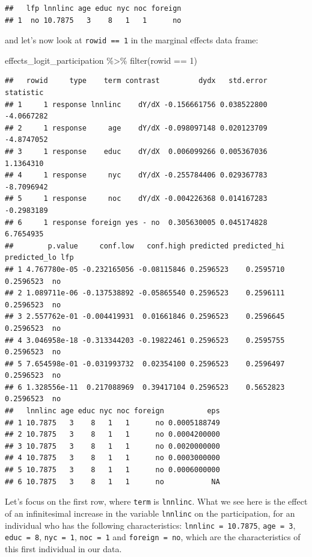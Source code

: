 \documentclass[
]{article}
\newenvironment{Shaded}{\begin{snugshade}}{\end{snugshade}}
\newcommand{\DecValTok}[1]{\textcolor[rgb]{0.00,0.00,0.81}{#1}}
\newcommand{\FunctionTok}[1]{\textcolor[rgb]{0.00,0.00,0.00}{#1}}
\newcommand{\NormalTok}[1]{#1}
\newcommand{\SpecialCharTok}[1]{\textcolor[rgb]{0.00,0.00,0.00}{#1}}
\begin{document}
\begin{verbatim}
##   lfp lnnlinc age educ nyc noc foreign
## 1  no 10.7875   3    8   1   1      no
\end{verbatim}

and let's now look at \texttt{rowid\ ==\ 1} in the marginal effects data frame:

\begin{Shaded}
\begin{Highlighting}[]
\NormalTok{effects\_logit\_participation }\SpecialCharTok{\%\textgreater{}\%}
  \FunctionTok{filter}\NormalTok{(rowid }\SpecialCharTok{==} \DecValTok{1}\NormalTok{)}
\end{Highlighting}
\end{Shaded}

\begin{verbatim}
##   rowid     type    term contrast         dydx   std.error  statistic
## 1     1 response lnnlinc    dY/dX -0.156661756 0.038522800 -4.0667282
## 2     1 response     age    dY/dX -0.098097148 0.020123709 -4.8747052
## 3     1 response    educ    dY/dX  0.006099266 0.005367036  1.1364310
## 4     1 response     nyc    dY/dX -0.255784406 0.029367783 -8.7096942
## 5     1 response     noc    dY/dX -0.004226368 0.014167283 -0.2983189
## 6     1 response foreign yes - no  0.305630005 0.045174828  6.7654935
##        p.value     conf.low   conf.high predicted predicted_hi predicted_lo lfp
## 1 4.767780e-05 -0.232165056 -0.08115846 0.2596523    0.2595710    0.2596523  no
## 2 1.089711e-06 -0.137538892 -0.05865540 0.2596523    0.2596111    0.2596523  no
## 3 2.557762e-01 -0.004419931  0.01661846 0.2596523    0.2596645    0.2596523  no
## 4 3.046958e-18 -0.313344203 -0.19822461 0.2596523    0.2595755    0.2596523  no
## 5 7.654598e-01 -0.031993732  0.02354100 0.2596523    0.2596497    0.2596523  no
## 6 1.328556e-11  0.217088969  0.39417104 0.2596523    0.5652823    0.2596523  no
##   lnnlinc age educ nyc noc foreign          eps
## 1 10.7875   3    8   1   1      no 0.0005188749
## 2 10.7875   3    8   1   1      no 0.0004200000
## 3 10.7875   3    8   1   1      no 0.0020000000
## 4 10.7875   3    8   1   1      no 0.0003000000
## 5 10.7875   3    8   1   1      no 0.0006000000
## 6 10.7875   3    8   1   1      no           NA
\end{verbatim}

Let's focus on the first row, where \texttt{term} is \texttt{lnnlinc}. What we see here is the effect of an infinitesimal
increase in the variable \texttt{lnnlinc} on the participation, for an individual who has the following
characteristics: \texttt{lnnlinc\ =\ 10.7875}, \texttt{age\ =\ 3}, \texttt{educ\ =\ 8}, \texttt{nyc\ =\ 1}, \texttt{noc\ =\ 1} and \texttt{foreign\ =\ no}, which
are the characteristics of this first individual in our data.
\end{document}
